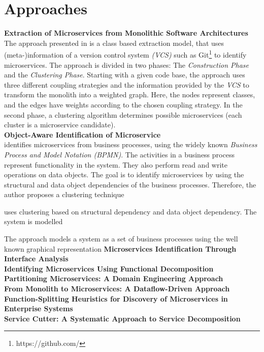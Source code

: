 \clearpage





\section{Approaches}


\noindent
\textbf{Extraction of Microservices from Monolithic Software Architectures   } \\
The approach presented in \cite{ExtractionMazlami} is a class based extraction model, that uses (meta-)information of a version control system \textit{(VCS)} such as Git\footnote{https://github.com/} to identify microservices. The approach is divided in two phases: The \textit{Construction Phase} and the \textit{Clustering Phase}.
Starting with a given code base, the approach uses three different coupling strategies and the information provided by the \textit{VCS} to transform the monolith into a weighted graph. Here, the nodes represent classes, and the edges have weights according to the chosen coupling strategy. In the second phase, a clustering algorithm determines possible microservices (each cluster is a microservice candidate). \\

\noindent
\textbf{Object-Aware Identification of Microservice  } \\
\cite{ObjectAwareAmiri} identifies microservices from business processes, using the widely known \textit{Business Process and Model Notation (BPMN)}. The activities in a business process represent functionality in the system. They also perform read and write operations on data objects. The goal is to identify microservices by using the structural and data object dependencies of the business processes. Therefore, the author proposes a clustering technique


\cite{ObjectAwareAmiri} uses clustering based on structural dependency and data object dependency. The system is modelled 





The approach models a system as a set of business processes using the well known graphical representation 
\noindent
\textbf{Microservices Identification Through Interface Analysis   } \\


\noindent
\textbf{Identifying Microservices Using Functional Decomposition  } \\


\noindent
\textbf{Partitioning Microservices: A Domain Engineering Approach } \\


\noindent
\textbf{From Monolith to Microservices: A Dataflow-Driven Approach } \\

\noindent
\textbf{Function-Splitting Heuristics for Discovery of Microservices in Enterprise Systems  } \\


\noindent
\textbf{Service Cutter: A Systematic Approach to Service Decomposition  } \\



